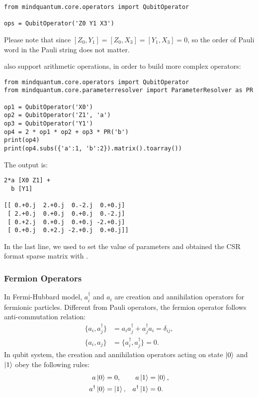\begin{lstlisting}
from mindquantum.core.operators import QubitOperator

ops = QubitOperator('Z0 Y1 X3')
\end{lstlisting}
Please note that since $[Z_0, Y_1]= [Z_0,X_3] = [Y_1, X_3]=0$, so the order of Pauli word in the Pauli string does not matter.

\QubitOperator also support arithmetic operations, in order to build more complex operators:

\begin{lstlisting}
from mindquantum.core.operators import QubitOperator
from mindquantum.core.parameterresolver import ParameterResolver as PR

op1 = QubitOperator('X0')
op2 = QubitOperator('Z1', 'a')
op3 = QubitOperator('Y1')
op4 = 2 * op1 * op2 + op3 * PR('b')
print(op4)
print(op4.subs({'a':1, 'b':2}).matrix().toarray())
\end{lstlisting}
The output is:
\begin{lstlisting}
2*a [X0 Z1] +
  b [Y1]

[[ 0.+0.j  2.+0.j  0.-2.j  0.+0.j]
 [ 2.+0.j  0.+0.j  0.+0.j  0.-2.j]
 [ 0.+2.j  0.+0.j  0.+0.j -2.+0.j]
 [ 0.+0.j  0.+2.j -2.+0.j  0.+0.j]]
\end{lstlisting}
In the last line, we used  to set the value of parameters and obtained the CSR format sparse matrix with .

\subsubsection{Fermion Operators}

In Fermi-Hubbard model, $a_i^\dagger$ and $a_i$ are creation and annihilation operators for fermionic particles. Different from Pauli operators, the fermion operator follows anti-commutation relation:
\begin{align*}
    \{a_i, a_j^\dagger\} & = a_ia_j^\dagger + a_j^\dagger a_i = \delta_{ij}, \\
    \{a_i, a_j\}         & = \{a_i^\dagger, a_j^\dagger\}=0.
\end{align*}
In qubit system, the creation and annihilation operators acting on state $\ket{0}$ and $\ket{1}$ obey the following rules:
\begin{align*}
    a\ket{0}          & =0,        & a\ket{1}          & =\ket{0}, \\
    a^\dagger \ket{0} & = \ket{1}, & a^\dagger \ket{1} & =0.
\end{align*}

